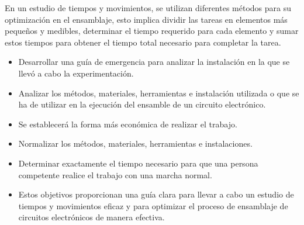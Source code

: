     En un estudio de tiempos y movimientos, se utilizan diferentes métodos para su optimización en el ensamblaje, esto implica dividir las tareas en elementos más pequeños y medibles, determinar el tiempo requerido para cada elemento y sumar estos tiempos para obtener el tiempo total necesario para completar la tarea.
    \begin{itemize}
            \item Desarrollar una guía de emergencia para analizar la instalación en la que se llevó a cabo la experimentación.
            \item Analizar los métodos, materiales, herramientas e instalación utilizada o que se ha de utilizar en la ejecución del ensamble de un circuito electrónico.
            \item Se establecerá la forma más económica de realizar el trabajo.
            \item Normalizar los métodos, materiales, herramientas e instalaciones.
            \item Determinar exactamente el tiempo necesario para que una persona competente realice el trabajo con una marcha normal.
        \end{itemize}
    \begin{itemize}
    \item Estos objetivos proporcionan una guía clara para llevar a cabo un estudio de tiempos y movimientos eficaz y para optimizar el proceso de ensamblaje de circuitos electrónicos de manera efectiva.\cite{Groover}
    \end{itemize}
    
